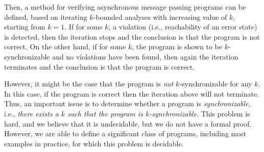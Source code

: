 Then, a method for verifying asynchronous message passing programs can be defined, 
based on iterating $k$-bounded analyses with increasing value of $k$, starting from $k=1$. If for some $k$, a violation (i.e., reachability of an error state) is detected, then the iteration stops and the conclusion is that the program is not correct. On the other hand, if for some $k$, the program is shown to be $k$-synchronizable and no violations have been found, then again the iteration terminates and the conclusion is that the program is correct. 

However, it might be the case that the program is {\em not} $k$-synchronizable for any $k$. In this case, if the program is correct then the iteration above will not terminate. Thus, an important issue is to determine whether a program is {\em synchronizable}, i.e., {\em there exists a $k$ such that the program is $k$-synchronizable}. This problem is hard, and we believe that it is undecidable, but we do not have a formal proof. However, we are able to define a significant class of programs, including most examples in practice, for which this problem is decidable.  
%
